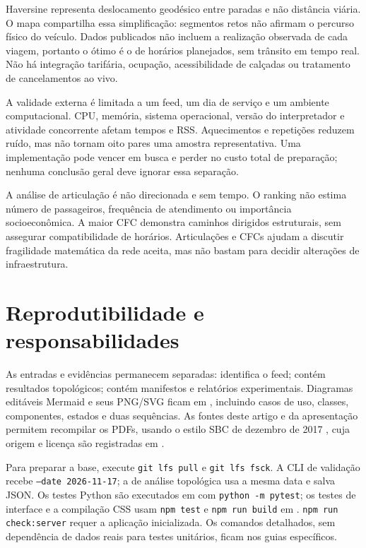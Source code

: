 \documentclass[12pt]{article}
\newcommand{\code}[1]{\texttt{#1}}
\begin{document}
Haversine representa deslocamento geodésico entre paradas e não distância viária. O mapa compartilha essa simplificação: segmentos retos não afirmam o percurso físico do veículo. Dados publicados não incluem a realização observada de cada viagem, portanto o ótimo é o de horários planejados, sem trânsito em tempo real. Não há integração tarifária, ocupação, acessibilidade de calçadas ou tratamento de cancelamentos ao vivo.

A validade externa é limitada a um feed, um dia de serviço e um ambiente computacional. CPU, memória, sistema operacional, versão do interpretador e atividade concorrente afetam tempos e RSS. Aquecimentos e repetições reduzem ruído, mas não tornam oito pares uma amostra representativa. Uma implementação pode vencer em busca e perder no custo total de preparação; nenhuma conclusão geral deve ignorar essa separação.

A análise de articulação é não direcionada e sem tempo. O ranking não estima número de passageiros, frequência de atendimento ou importância socioeconômica. A maior CFC demonstra caminhos dirigidos estruturais, sem assegurar compatibilidade de horários. Articulações e CFCs ajudam a discutir fragilidade matemática da rede aceita, mas não bastam para decidir alterações de infraestrutura.

\section{Reprodutibilidade e responsabilidades}
As entradas e evidências permanecem separadas:  identifica o feed;  contém resultados topológicos;  contém manifestos e relatórios experimentais. Diagramas editáveis Mermaid e seus PNG/SVG ficam em , incluindo casos de uso, classes, componentes, estados e duas sequências. As fontes deste artigo e da apresentação permitem recompilar os PDFs, usando o estilo SBC de dezembro de 2017 \cite{sbc}, cuja origem e licença são registradas em .

Para preparar a base, execute \code{git lfs pull} e \code{git lfs fsck}. A CLI de validação recebe \code{--date 2026-11-17}; a de análise topológica usa a mesma data e salva JSON. Os testes Python são executados em  com \code{python -m pytest}; os testes de interface e a compilação CSS usam \code{npm test} e \code{npm run build} em . \code{npm run check:server} requer a aplicação inicializada. Os comandos detalhados, sem dependência de dados reais para testes unitários, ficam nos guias específicos.
\end{document}
